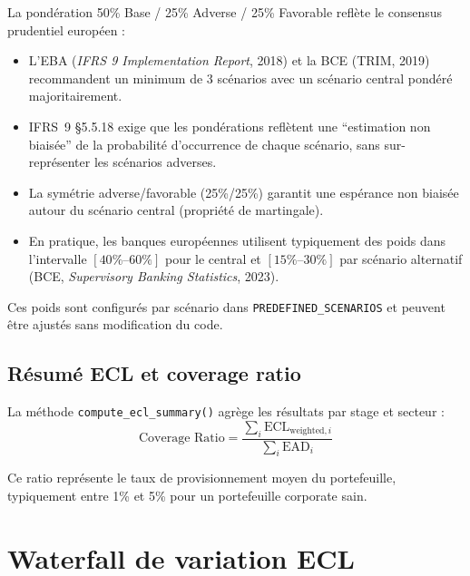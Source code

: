 \documentclass[12pt,a4paper]{article}
\begin{document}
\begin{interpretbox}
La pond\'eration 50\% Base / 25\% Adverse / 25\% Favorable refl\`ete le consensus prudentiel europ\'een :
\begin{itemize}
    \item L'EBA (\textit{IFRS 9 Implementation Report}, 2018) et la BCE (TRIM, 2019) recommandent un minimum de 3 sc\'enarios avec un sc\'enario central pond\'er\'e majoritairement.
    \item IFRS~9 \S5.5.18 exige que les pond\'erations refl\`etent une ``estimation non biais\'ee'' de la probabilit\'e d'occurrence de chaque sc\'enario, sans sur-repr\'esenter les sc\'enarios adverses.
    \item La sym\'etrie adverse/favorable (25\%/25\%) garantit une esp\'erance non biais\'ee autour du sc\'enario central (propri\'et\'e de martingale).
    \item En pratique, les banques europ\'eennes utilisent typiquement des poids dans l'intervalle $[40\%\text{--}60\%]$ pour le central et $[15\%\text{--}30\%]$ par sc\'enario alternatif (BCE, \textit{Supervisory Banking Statistics}, 2023).
\end{itemize}
Ces poids sont configur\'es par sc\'enario dans \texttt{PREDEFINED\_SCENARIOS} et peuvent \^etre ajust\'es sans modification du code.
\end{interpretbox}

\subsection{R\'esum\'e ECL et coverage ratio}

La m\'ethode \texttt{compute\_ecl\_summary()} agr\`ege les r\'esultats par stage et secteur :
\begin{equation}
\text{Coverage Ratio} = \frac{\sum_i \text{ECL}_{\text{weighted},i}}{\sum_i \text{EAD}_i}
\end{equation}

Ce ratio repr\'esente le taux de provisionnement moyen du portefeuille, typiquement entre 1\% et 5\% pour un portefeuille corporate sain.

\newpage
\section{Waterfall de variation ECL}
\label{sec:waterfall}
\end{document}
